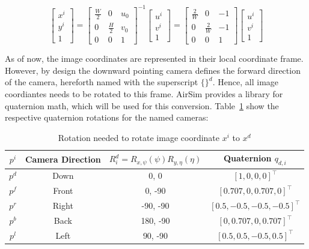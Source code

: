 \begin{equation}
    \begin{bmatrix}
        x^i \\ y^i \\ 1
    \end{bmatrix} = \begin{bmatrix}
        \frac{W}{2} & 0 & u_0 \\
        0 & \frac{H}{2} & v_0 \\
        0 & 0 & 1
    \end{bmatrix}^{-1}\begin{bmatrix}
        u^i \\ v^i \\ 1
    \end{bmatrix} = \begin{bmatrix}
        \frac{2}{W} & 0 & -1 \\
        0 & \frac{2}{W} & -1 \\
        0 & 0 & 1
    \end{bmatrix}\begin{bmatrix}
        u^i \\ v^i \\ 1
    \end{bmatrix}
    \label{eq:impl_pixel_inverse_transform}
\end{equation}

As of now, the image coordinates are represented in their local coordinate frame. However, by design the downward pointing camera defines the forward direction of the camera, hereforth named with the superscript $\{\}^d$. Hence, all image coordiantes needs to be rotated to this frame. AirSim provides a library for quaternion math, which will be used for this conversion. Table~\ref{tab:impl_quaternion_rotations} show the respective quaternion rotations for the named cameras:

\begin{table}[!htb]
    \centering
    \begin{tabular}{|c|c|c|c|} \hline
        $p^i$ & Camera Direction & $R^d_i = R_{x,\psi}(\psi)R_{y,\eta}(\eta)$ & Quaternion $q_{d,i}$ \\ \hline \hline
        $p^d$ & Down & 0, 0 & $[1,0,0,0]^\top$ \\ \hline
        $p^f$ & Front & 0, -90 & $[0.707,0,0.707,0]^\top$ \\ \hline
        $p^r$ & Right & -90, -90 & $[0.5,-0.5,-0.5,-0.5]^\top$\\ \hline
        $p^b$ & Back & 180, -90 & $[0,0.707,0,0.707]^\top$ \\ \hline
        $p^l$ & Left & 90, -90 & $[0.5,0.5,-0.5,0.5]^\top$\\ \hline
    \end{tabular}
    \caption{Rotation needed to rotate image coordinate $x^i$ to $x^d$}
    \label{tab:impl_quaternion_rotations}
\end{table}


